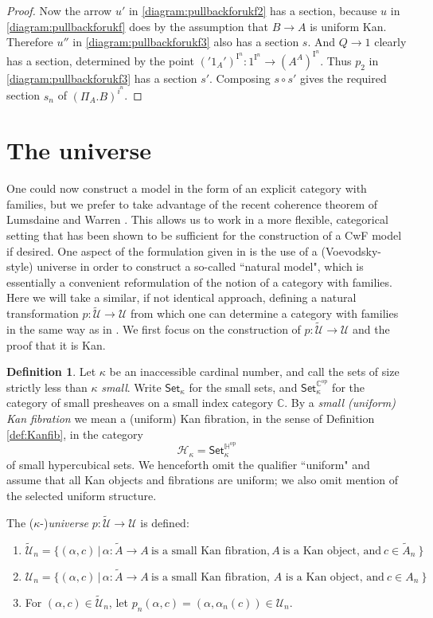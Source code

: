 \documentclass[11pt]{article}
\newcommand{\C}{\ensuremath{\mathbb{C}}}
\newcommand{\Set}{\ensuremath{\mathsf{Set}}}
\newcommand{\I}{\ensuremath{\mathrm{I}}}
\renewcommand{\H}{\ensuremath{\mathbb{H}}}
\newcommand{\HH}{\ensuremath{\mathcal{H}}}
\newcommand{\U}{\ensuremath{\mathcal{U}}}
\newcommand{\UU}{\ensuremath{\widetilde{\mathcal{U}}}}
\theoremstyle{remark}
\theoremstyle{definition}
\newtheorem{definition}[theorem]{Definition}
\begin{document}
\begin{proof}
Now the arrow $u'$ in \eqref{diagram:pullbackforukf2} has a section, because $u$ in \eqref{diagram:pullbackforukf} does by the assumption that $B\to A$ is uniform Kan.  Therefore $u''$ in \eqref{diagram:pullbackforukf3} also has a section $s$.  And $Q\to 1$ clearly has a section, determined by the point  $('1_A')^{\I^n}
: 1^{\I^n} \to (A^A)^{\I^n}$.  Thus $p_2$ in \eqref{diagram:pullbackforukf3} has a section $s'$.  Composing $s\circ s'$ gives the required section $s_n$ of $(\Pi_A.B )^{i^n}$.
\end{proof}


\section{The universe}

One could now construct a  model in the form of an explicit category with families, but we prefer to take advantage of the recent coherence theorem of Lumsdaine and Warren \cite{L&M}.  This allows us to work in a more flexible, categorical setting that has been shown to be sufficient for the construction of a CwF model if desired.  One aspect of the formulation given in \cite{natural} is the use of a (Voevodsky-style) universe in order to construct a so-called ``natural model", which is essentially a convenient reformulation of the notion of a category with families.
Here we will take a similar, if not identical approach, defining a natural transformation $p : \UU \to \U$ from which one can determine a category with families in the same way as in  \cite{natural}.  We first focus on the construction of $p : \UU \to \U$ and the proof that it is Kan.

\begin{definition}
Let $\kappa$ be an inaccessible cardinal number, and call the sets of size strictly less than $\kappa$ \emph{small}.  Write $\Set_\kappa$ for the small sets, and $\Set_\kappa^{\C^{\mathrm{op}}}$ for the category of small presheaves on a small index category $\C$.  By a \emph{small (uniform) Kan fibration} we mean a (uniform) Kan fibration, in the sense of Definition \ref{def:Kanfib}, in the category 
\[
\HH_\kappa = \Set_\kappa^{\H^{\mathrm{op}}}
\]
 of small hypercubical sets.  We henceforth omit the qualifier ``uniform" and assume that all Kan objects and fibrations are uniform; we also omit mention of the selected uniform structure.

The ($\kappa$-)\emph{universe} $p : \UU \to \U$ is defined:
\begin{enumerate}
\item $\UU_n = \{ (\alpha, c)\, |\, \alpha : \tilde{A}\to A\ \text{is a small Kan fibration}, A\ \text{is a Kan object, and}\ c\in \tilde{A}_n\ \}$

\item $\U_n = \{ (\alpha, c)\, |\, \alpha : \tilde{A}\to A\ \text{is a small Kan fibration, $A$ is a Kan object, and}\ c\in A_n\ \}$

\item For $(\alpha, c)\in \UU_n$, let $p_n (\alpha, c) = (\alpha, \alpha_n(c)) \in \U_n$.
\end{enumerate}
\end{definition}
\end{document}
